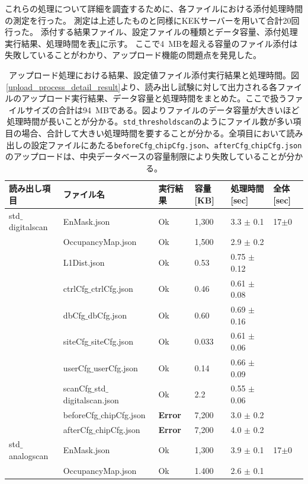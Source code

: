 これらの処理について詳細を調査するために、各ファイルにおける添付処理時間の測定を行った。
測定は上述したものと同様にKEKサーバーを用いて合計20回行った。
添付する結果ファイル、設定ファイルの種類とデータ容量、添付処理実行結果、処理時間を表\ref{upload_status_to_pd}に示す。
ここで4~MBを超える容量のファイル添付は失敗していることがわかり、アップロード機能の問題点を発見した。

\clearpage
{ \scriptsize
\begin{longtable}{|llllll|}
  \caption[アップロード処理における結果、設定値ファイル添付実行結果と処理時間]{アップロード処理における結果、設定値ファイル添付実行結果と処理時間。図\ref{upload_process_detail_result}より、読み出し試験に対して出力される各ファイルのアップロード実行結果、データ容量と処理時間をまとめた。ここで扱うファイルサイズの合計は94~MBである。図よりファイルのデータ容量が大きいほど処理時間が長いことが分かる。\texttt{std$\_$thresholdscan}のようにファイル数が多い項目の場合、合計して大きい処理時間を要することが分かる。全項目において読み出しの設定ファイルにあたる\texttt{beforeCfg$\_$chipCfg.json}、\texttt{afterCfg$\_$chipCfg.json}のアップロードは、中央データベースの容量制限により失敗していることが分かる。}
  \label{upload_status_to_pd}
  \endhead
  \hline
  読み出し項目 & ファイル名 & 実行結果 & 容量[KB] & 処理時間[sec] & 全体[sec]\\ 
  \hline
std$\_$digitalscan & EnMask.json & Ok & 1,300 & 3.3 $\pm$ 0.1 & 17$\pm$0 \\
 & OccupancyMap.json & Ok & 1,500 & 2.9 $\pm$ 0.2 & \\
 & L1Dist.json & Ok & 0.53 & 0.75 $\pm$ 0.12 & \\
 & ctrlCfg$\_$ctrlCfg.json & Ok & 0.46 & 0.61 $\pm$ 0.08 & \\
 & dbCfg$\_$dbCfg.json & Ok & 0.60 & 0.69 $\pm$ 0.16 & \\
 & siteCfg$\_$siteCfg.json & Ok & 0.033 & 0.61 $\pm$ 0.06 & \\
 & userCfg$\_$userCfg.json & Ok & 0.14 & 0.66 $\pm$ 0.09 & \\
 & scanCfg$\_$std$\_$digitalscan.json & Ok & 2.2 & 0.55 $\pm$ 0.06 & \\
 & beforeCfg$\_$chipCfg.json & { \bf Error} & 7,200 & 3.0 $\pm$ 0.2 & \\
 & afterCfg$\_$chipCfg.json & { \bf Error} & 7,200 & 4.0 $\pm$ 0.2 & \\
\hline
std$\_$analogscan & EnMask.json & Ok & 1,300 & 3.9 $\pm$ 0.1 & 17$\pm$0\\
 & OccupancyMap.json & Ok & 1.400 & 2.6 $\pm$ 0.1 & \\

\end{longtable}}

